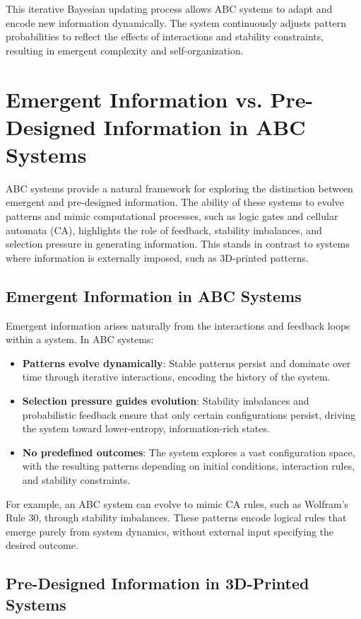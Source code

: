 \documentclass[entropy,article,submit,pdftex,moreauthors]{Definitions/mdpi}
\begin{document}
This iterative Bayesian updating process allows ABC systems to adapt and encode new information dynamically. The system continuously adjusts pattern probabilities to reflect the effects of interactions and stability constraints, resulting in emergent complexity and self-organization.

\section{Emergent Information vs. Pre-Designed Information in ABC Systems}

ABC systems provide a natural framework for exploring the distinction between emergent and pre-designed information. The ability of these systems to evolve patterns and mimic computational processes, such as logic gates and cellular automata (CA), highlights the role of feedback, stability imbalances, and selection pressure in generating information. This stands in contrast to systems where information is externally imposed, such as 3D-printed patterns.

\subsection{Emergent Information in ABC Systems}

Emergent information arises naturally from the interactions and feedback loops within a system. In ABC systems:
\begin{itemize}
    \item \textbf{Patterns evolve dynamically}: Stable patterns persist and dominate over time through iterative interactions, encoding the history of the system.
    \item \textbf{Selection pressure guides evolution}: Stability imbalances and probabilistic feedback ensure that only certain configurations persist, driving the system toward lower-entropy, information-rich states.
    \item \textbf{No predefined outcomes}: The system explores a vast configuration space, with the resulting patterns depending on initial conditions, interaction rules, and stability constraints.
\end{itemize}
For example, an ABC system can evolve to mimic CA rules, such as Wolfram’s Rule 30, through stability imbalances. These patterns encode logical rules that emerge purely from system dynamics, without external input specifying the desired outcome.

\subsection{Pre-Designed Information in 3D-Printed Systems}
\end{document}
